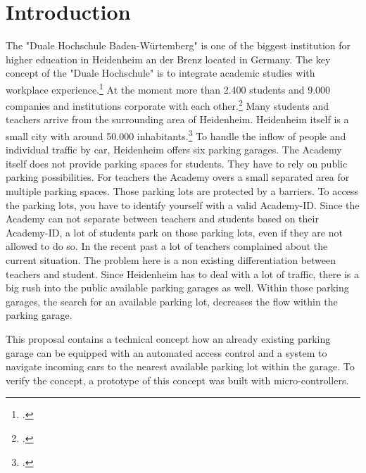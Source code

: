 \chapter{Introduction}
\par
The "Duale Hochschule Baden-Würtemberg" is one of the biggest institution for higher education in Heidenheim an der Brenz located in Germany. The key concept of the "Duale Hochschule" is to integrate academic studies with workplace experience.\footcite[][]{dhbwCooperativeState} 
At the moment more than 2.400 students and 9.000 companies and institutions corporate with each other.\footcite[][]{dhbwCooperativeState} 
Many students and teachers arrive from the surrounding area of Heidenheim. Heidenheim itself is a small city with around 50.000 inhabitants.\footcite[][]{heidenheimZahlenDaten}
To handle the inflow of people and individual traffic by car, Heidenheim offers six parking garages. The Academy itself does not provide parking spaces for students. They have to rely on public parking possibilities.
For teachers the Academy overs a small separated area for multiple parking spaces. Those parking lots are protected by a barriers. To access the parking lots, you have to identify yourself with a valid Academy-ID. Since the Academy can not separate between teachers and students based on their Academy-ID, a lot of students park on those parking lots, even if they are not allowed to do so. In the recent past a lot of teachers complained about the current situation. The problem here is a non existing differentiation between teachers and student.
Since Heidenheim has to deal with a lot of traffic, there is a big rush into the public available parking garages as well. Within those parking garages, the search for an available parking lot, decreases the flow within the parking garage. 
\par
This proposal contains a technical concept how an already existing parking garage can be equipped with an automated access control and a system to navigate incoming cars to the nearest available parking lot within the garage. 
To verify the concept, a prototype of this concept was built with micro-controllers.
